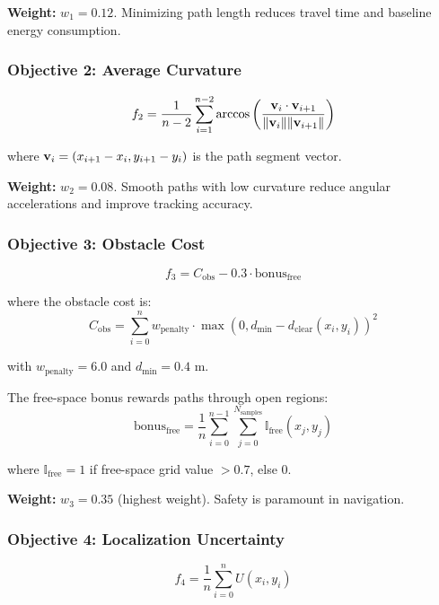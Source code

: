 \textbf{Weight:} $w_1 = 0.12$. Minimizing path length reduces travel time and baseline energy consumption.

\subsubsection{Objective 2: Average Curvature}
\begin{equation}
f_2 = \frac{1}{n-2} \sum_{i=1}^{n-2} \arccos\left( \frac{\mathbf{v}_i \cdot \mathbf{v}_{i+1}}{\|\mathbf{v}_i\| \|\mathbf{v}_{i+1}\|} \right)
\label{eq:obj_curvature}
\end{equation}

where $\mathbf{v}_i = (x_{i+1} - x_i, y_{i+1} - y_i)$ is the path segment vector.

\textbf{Weight:} $w_2 = 0.08$. Smooth paths with low curvature reduce angular accelerations and improve tracking accuracy.

\subsubsection{Objective 3: Obstacle Cost}
\begin{equation}
f_3 = C_{\text{obs}} - 0.3 \cdot \text{bonus}_{\text{free}}
\label{eq:obj_obstacle_main}
\end{equation}

where the obstacle cost is:
\begin{equation}
C_{\text{obs}} = \sum_{i=0}^{n} w_{\text{penalty}} \cdot \max(0, d_{\min} - d_{\text{clear}}(x_i, y_i))^2
\label{eq:obstacle_cost}
\end{equation}

with $w_{\text{penalty}} = 6.0$ and $d_{\min} = 0.4$ m.

The free-space bonus rewards paths through open regions:
\begin{equation}
\text{bonus}_{\text{free}} = \frac{1}{n} \sum_{i=0}^{n-1} \sum_{j=0}^{N_{\text{samples}}} \mathbb{I}_{\text{free}}(x_j, y_j)
\label{eq:free_space_bonus}
\end{equation}

where $\mathbb{I}_{\text{free}} = 1$ if free-space grid value $> 0.7$, else 0.

\textbf{Weight:} $w_3 = 0.35$ (highest weight). Safety is paramount in navigation.

\subsubsection{Objective 4: Localization Uncertainty}
\begin{equation}
f_4 = \frac{1}{n} \sum_{i=0}^{n} U(x_i, y_i)
\label{eq:obj_uncertainty}
\end{equation}

